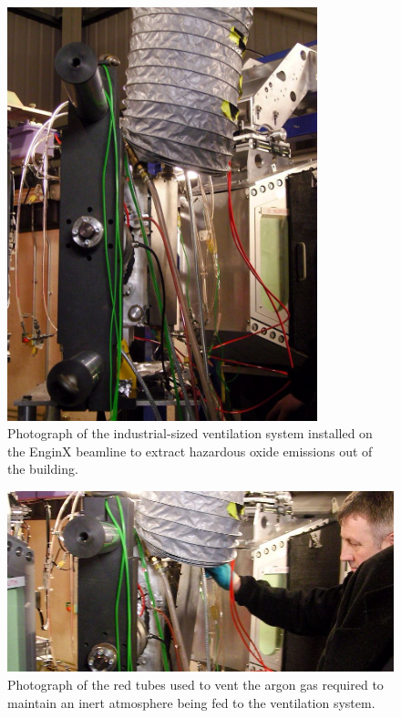 \begin{figure}[H]
\begin{center}
\includegraphics[width=9cm]{enginxvent}
\caption{Photograph of the industrial-sized ventilation system installed on the EnginX beamline to extract hazardous oxide emissions out of the building.}\label{fig:enginxvent}
\end{center}
\end{figure}
%
%
\begin{figure}[H]
\begin{center}
\includegraphics[width=14cm]{tubesinvent}
\caption{Photograph of the red tubes used to vent the argon gas required to maintain an inert atmosphere being fed to the ventilation system.}\label{fig:tubesinvent}
\end{center}
\end{figure}
%


